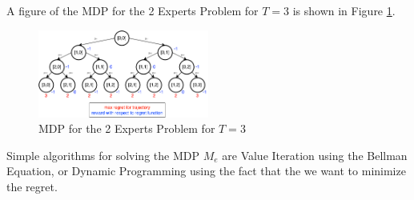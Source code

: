 \documentclass[a4paper, 12pt]{article}
\begin{document}
A figure of the MDP for the 2 Experts Problem for $T=3$ is shown in Figure \ref{fig:MDP}.
\begin{figure}[H]
    \centering
    \includegraphics[width=0.5\textwidth]{MDP.png}
    \caption{MDP for the 2 Experts Problem for $T=3$}
    \label{fig:MDP}
\end{figure}

Simple algorithms for solving the MDP $M_e$ are Value Iteration using the Bellman Equation, 
or Dynamic Programming using the fact that the we want to minimize the regret. 
\end{document}
